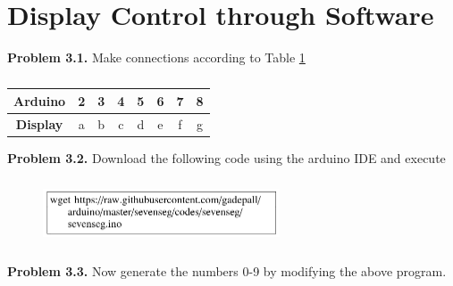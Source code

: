 \documentclass[journal,12pt,twocolumn]{IEEEtran}
\begin{document}
	\section{Display Control through Software}
		\textbf{Problem 3.1.} Make connections according to Table \ref{table:ard_disp_num} \\
		\begin{table}[h!]
		\begin{center}
			\begin{tabular}{ |c|c|c|c|c|c|c|c| } 
				\hline
				\textbf{Arduino} & 2 & 3 & 4 & 5 & 6 & 7 & 8  \\ 
				\hline
				\textbf{Display} & a & b & c & d & e & f & g  \\ 
				\hline
			\end{tabular}
			\caption{}
			\label{table:ard_disp_num}
		\end{center}
	\end{table}
		\textbf{Problem 3.2.} Download the following code using the arduino IDE and execute \\
	\begin{figure}[h!]
	\begin{center}
		\includegraphics[width=7cm,height=2cm]{./code}
	\end{center}
	
\end{figure} 	%
		\textbf{Problem 3.3.} Now generate the numbers 0-9 by modifying the above program.
	

	
\end{document}
